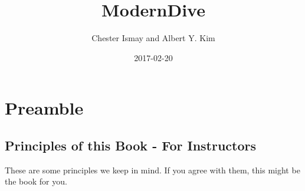 \documentclass[]{tufte-book}
\title{ModernDive}
\author{Chester Ismay and Albert Y. Kim}
\date{2017-02-20}
\theoremstyle{definition}
\theoremstyle{definition}
\theoremstyle{remark}
\begin{document}
\let\allcaps=\relax
\maketitle



{
\setcounter{tocdepth}{1}
\tableofcontents
}

\chapter{Preamble}\label{preamble}

\section{Principles of this Book - For
Instructors}\label{principles-of-this-book---for-instructors}

These are some principles we keep in mind. If you agree with them, this
might be the book for you.
\end{document}

